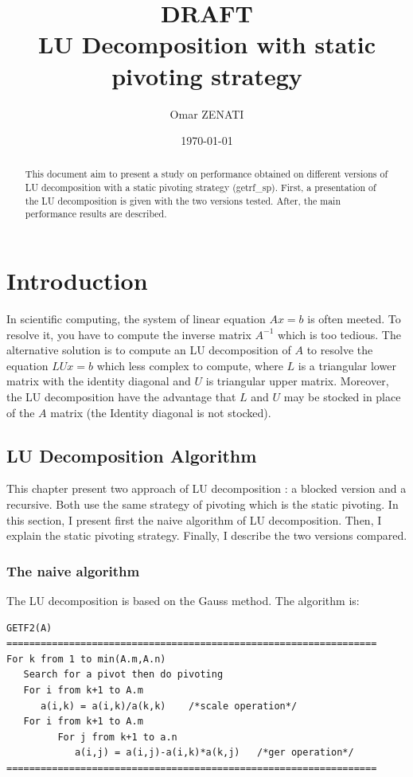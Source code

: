 \documentclass{report}
\title{\Huge{\textbf{DRAFT}}\\
\Huge{LU Decomposition with static pivoting strategy}}
\author{Omar ZENATI}
\date{\today}
\begin{document}
\maketitle
\begin{abstract}
This document aim to present a study on performance obtained on different versions of LU decomposition with a static pivoting strategy (getrf\_sp). First, a presentation of the LU decomposition is given with the two versions tested. After, the main performance results are described.
\end{abstract}
\tableofcontents

\chapter{Introduction}

In scientific computing, the system of linear equation $Ax = b$ is often meeted. To resolve it, you have to compute the inverse matrix $A^{-1}$ which is too tedious. The alternative solution is to compute an LU decomposition of $A$ to resolve the equation $LUx = b$ which less complex to compute, where $L$ is a triangular lower matrix with the identity diagonal and $U$ is triangular upper matrix. Moreover, the LU decomposition have the advantage that $L$ and $U$ may be stocked in place of the $A$ matrix (the Identity diagonal is not stocked).

\section{LU Decomposition Algorithm}
This chapter present two approach of LU decomposition : a blocked version and a recursive. Both use the same strategy of pivoting which is the static pivoting. In this section, I present first the naive algorithm of LU decomposition. Then, I explain the static pivoting strategy. Finally, I describe the two versions compared.

\subsection{The naive algorithm}
The LU decomposition is based on the Gauss method. The algorithm is:
\begin{verbatim}
GETF2(A)
=================================================================
For k from 1 to min(A.m,A.n)
   Search for a pivot then do pivoting
   For i from k+1 to A.m
      a(i,k) = a(i,k)/a(k,k)    /*scale operation*/
   For i from k+1 to A.m
         For j from k+1 to a.n
            a(i,j) = a(i,j)-a(i,k)*a(k,j)   /*ger operation*/
=================================================================
\end{verbatim} 
\end{document}
